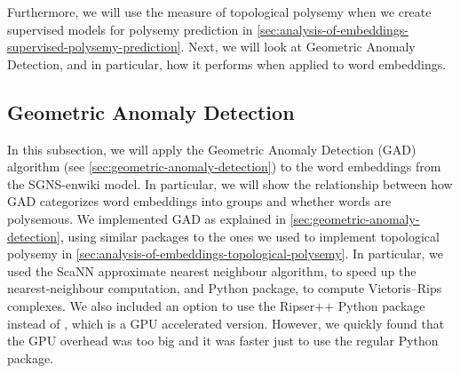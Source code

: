 Furthermore, we will use the measure of topological polysemy when we create supervised models for polysemy prediction in \cref{sec:analysis-of-embeddings-supervised-polysemy-prediction}. Next, we will look at Geometric Anomaly Detection, and in particular, how it performs when applied to word embeddings.

\subsection{Geometric Anomaly Detection}
\label{sec:analysis-of-embeddings-geometric-anomaly-detection}
In this subsection, we will apply the Geometric Anomaly Detection (GAD) algorithm (see \cref{sec:geometric-anomaly-detection}) to the word embeddings from the SGNS-enwiki model. In particular, we will show the relationship between how GAD categorizes word embeddings into groups and whether words are polysemous. We implemented GAD as explained in \cref{sec:geometric-anomaly-detection}, using similar packages to the ones we used to implement topological polysemy in \cref{sec:analysis-of-embeddings-topological-polysemy}. In particular, we used the ScaNN \cite{scann2020} approximate nearest neighbour algorithm, to speed up the nearest-neighbour computation, and  \cite{ctralie2018ripser} Python package, to compute Vietoris–Rips complexes. We also included an option to use the Ripser++ \cite{zhang2020ripserplusplus} Python package instead of , which is a GPU accelerated version. However, we quickly found that the GPU overhead was too big and it was faster just to use the regular  Python package.

